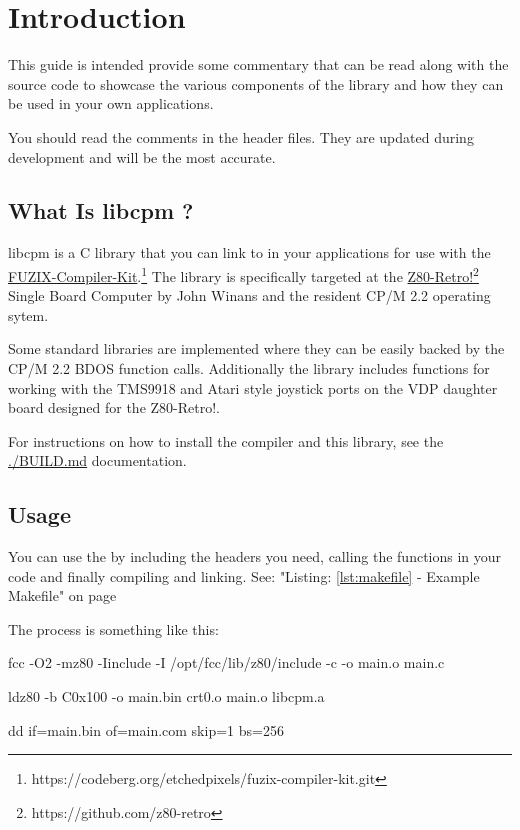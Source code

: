 \documentclass[10pt,a4paper,hidelinks]{article}
\title{\lib}
\author{David Latham}
\date{September, 2025}
\def\lib{libcpm }
\begin{document}
\maketitle
\tableofcontents
\pagebreak
\section{Introduction}

This guide is intended provide some commentary that can be read along with the
source code to showcase the various components of the library and how they can
be used in your own applications.

You should read the comments in the header files.  They are updated during
development and will be the most accurate.

\subsection{What Is \lib?}

\lib is a C library that you can link to in your applications for
use with the
\href{https://codeberg.org/etchedpixels/fuzix-compiler-kit.git}{FUZIX-Compiler-Kit}.\footnote{https://codeberg.org/etchedpixels/fuzix-compiler-kit.git}
The library is specifically targeted at the
\href{https://github.com/z80-retro}{Z80-Retro!}\footnote{https://github.com/z80-retro} Single Board Computer by John
Winans and the resident CP/M 2.2 operating sytem.

Some standard libraries are implemented where they can be easily backed by the
CP/M 2.2 BDOS function calls.  Additionally the library includes functions for
working with the TMS9918 and Atari style joystick ports on the VDP daughter
board designed for the Z80-Retro!.

For instructions on how to install the compiler and this library, see the
\url{./BUILD.md} documentation.

\subsection{Usage}

You can use the by including the headers you need, calling the functions in
your code and finally compiling and linking. See: "Listing: \ref{lst:makefile}
- Example Makefile" on page \pageref{lst:makefile}

The process is something like this:

\begin{description}[font=$\bullet$~\normalfont\scshape\color{red!50!black}]
  \item[Compile] fcc -O2 -mz80 -Iinclude -I /opt/fcc/lib/z80/include -c -o
    main.o main.c
  \item[Link] ldz80 -b C0x100 -o main.bin crt0.o main.o libcpm.a
  \item[Truncate] dd if=main.bin of=main.com skip=1 bs=256
\end{description}
\end{document}
